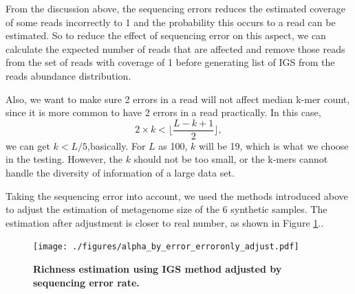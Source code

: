From the discussion above, the sequencing errors reduces the estimated coverage of some
reads incorrectly to 1 and the probability this occurs to a read can be
estimated. So to reduce the effect of sequencing error on this aspect, we can
calculate the expected number of reads that are affected and remove those reads
from the set of reads with coverage of 1 before generating list of IGS from the
reads abundance distribution.

Also, we want to make sure 2 errors in a read will not affect median k-mer 
count, since it is more common to have 2 errors in a read practically. 
In this case, 
\[2 \times k < \lfloor \frac{L-k+1}{2}\rfloor,\]
we can get $k<L/5$,basically. For $L$ as 100, $k$ will be 19, which is what we 
choose in the testing. However, the $k$ should not be too small, or the k-mers 
cannot handle the diversity of information of a large data set.

Taking the sequencing error into account, we used the methods introduced above
to adjust the estimation of metagenome size of the 6 synthetic samples. The
estimation after adjustment is closer to real number, as shown in Figure
\ref{fig:IGS_richness_error_adjustment}..


\begin{figure}[!ht]
 \centerline{\texttt{[image: ./figures/alpha\_by\_error\_erroronly\_adjust.pdf]}}
\caption{\bf Richness estimation using IGS method adjusted by sequencing error
rate.}
\label{fig:IGS_richness_error_adjustment}
\end{figure}

